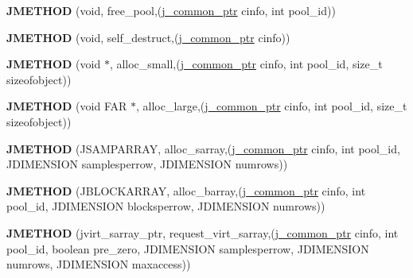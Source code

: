 \begin{DoxyCompactItemize}
\item 
\mbox{\label{structjpeg__memory__mgr_a7e7e063767441999982d22c5cc0e9423}} 
{\bfseries J\+M\+E\+T\+H\+OD} (void, free\+\_\+pool,(\hyperlink{structjpeg__common__struct}{j\+\_\+common\+\_\+ptr} cinfo, int pool\+\_\+id))
\item 
\mbox{\label{structjpeg__memory__mgr_ae80ddea0ba4f845f91d3a30e350b5f44}} 
{\bfseries J\+M\+E\+T\+H\+OD} (void, self\+\_\+destruct,(\hyperlink{structjpeg__common__struct}{j\+\_\+common\+\_\+ptr} cinfo))
\item 
\mbox{\label{structjpeg__memory__mgr_a9372ad24444dda23175cc9203105911c}} 
{\bfseries J\+M\+E\+T\+H\+OD} (void $\ast$, alloc\+\_\+small,(\hyperlink{structjpeg__common__struct}{j\+\_\+common\+\_\+ptr} cinfo, int pool\+\_\+id, size\+\_\+t sizeofobject))
\item 
\mbox{\label{structjpeg__memory__mgr_a130f6dbc700cc045bdbe35beff2cb326}} 
{\bfseries J\+M\+E\+T\+H\+OD} (void F\+AR $\ast$, alloc\+\_\+large,(\hyperlink{structjpeg__common__struct}{j\+\_\+common\+\_\+ptr} cinfo, int pool\+\_\+id, size\+\_\+t sizeofobject))
\item 
\mbox{\label{structjpeg__memory__mgr_a3fdd2e1dfdc089fd61f17b608c0263f2}} 
{\bfseries J\+M\+E\+T\+H\+OD} (J\+S\+A\+M\+P\+A\+R\+R\+AY, alloc\+\_\+sarray,(\hyperlink{structjpeg__common__struct}{j\+\_\+common\+\_\+ptr} cinfo, int pool\+\_\+id, J\+D\+I\+M\+E\+N\+S\+I\+ON samplesperrow, J\+D\+I\+M\+E\+N\+S\+I\+ON numrows))
\item 
\mbox{\label{structjpeg__memory__mgr_aefc8abe884dab5648c1e4e7ada2e2e18}} 
{\bfseries J\+M\+E\+T\+H\+OD} (J\+B\+L\+O\+C\+K\+A\+R\+R\+AY, alloc\+\_\+barray,(\hyperlink{structjpeg__common__struct}{j\+\_\+common\+\_\+ptr} cinfo, int pool\+\_\+id, J\+D\+I\+M\+E\+N\+S\+I\+ON blocksperrow, J\+D\+I\+M\+E\+N\+S\+I\+ON numrows))
\item 
\mbox{\label{structjpeg__memory__mgr_a34b830d9d7b2f4fd043e98421a700503}} 
{\bfseries J\+M\+E\+T\+H\+OD} (jvirt\+\_\+sarray\+\_\+ptr, request\+\_\+virt\+\_\+sarray,(\hyperlink{structjpeg__common__struct}{j\+\_\+common\+\_\+ptr} cinfo, int pool\+\_\+id, boolean pre\+\_\+zero, J\+D\+I\+M\+E\+N\+S\+I\+ON samplesperrow, J\+D\+I\+M\+E\+N\+S\+I\+ON numrows, J\+D\+I\+M\+E\+N\+S\+I\+ON maxaccess))

\end{DoxyCompactItemize}
